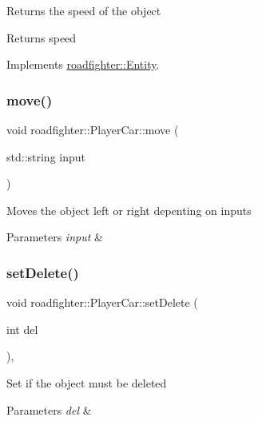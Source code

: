 Returns the speed of the object \begin{DoxyReturn}{Returns}
speed 
\end{DoxyReturn}


Implements \hyperlink{classroadfighter_1_1Entity_ad3760184d764a61922e1db7d98501ee4}{roadfighter\+::\+Entity}.

\mbox{\label{classroadfighter_1_1PlayerCar_af6a39916181bce4cab033d0b4370cfba}} 
\subsubsection{\texorpdfstring{move()}{move()}}
{\footnotesize\ttfamily void roadfighter\+::\+Player\+Car\+::move (\begin{DoxyParamCaption}\item[{std\+::string}]{input }\end{DoxyParamCaption})\hspace{0.3cm}{\ttfamily [protected]}}

Moves the object left or right depenting on inputs 
\begin{DoxyParams}{Parameters}
{\em input} & \\
\hline
\end{DoxyParams}
\mbox{\label{classroadfighter_1_1PlayerCar_a24401332a8585b0fcfbfd33df93021e0}} 
\subsubsection{\texorpdfstring{set\+Delete()}{setDelete()}}
{\footnotesize\ttfamily void roadfighter\+::\+Player\+Car\+::set\+Delete (\begin{DoxyParamCaption}\item[{int}]{del }\end{DoxyParamCaption})\hspace{0.3cm}{\ttfamily [override]}, {\ttfamily [virtual]}}

Set if the object must be deleted 
\begin{DoxyParams}{Parameters}
{\em del} & \\
\hline
\end{DoxyParams}


